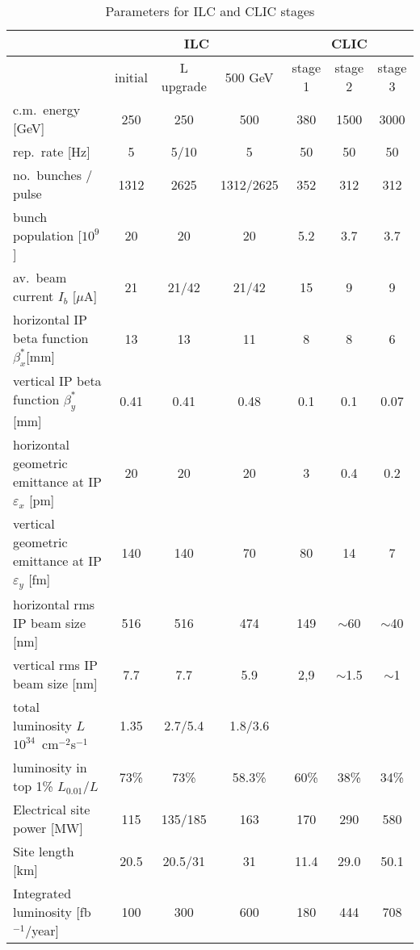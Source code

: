 \begin{landscape}
\begin{table}[htbp]
\caption{Parameters for ILC and CLIC stages}
\label{tab:ilc-clic}
\begin{center}
\begin{tabular}{l|ccc|ccc}
\hline\hline
 &  \multicolumn{3}{c|}{ILC} &
 \multicolumn{3}{c}{CLIC} \\
 \hline
  & initial & L upgrade  &  500 GeV &  stage 1 & stage 2 & stage 3 \\
 \hline
 c.m.~energy [GeV] & 250 & 250 & 500 & 380 &
 1500 & 3000 \\
 rep.~rate [Hz] & 5 & 5/10 & 5 & 50 & 50 & 50 \\
 no.~bunches / pulse & 1312 & 2625 & 1312/2625 & 
352 & 312 & 312 \\
 bunch population [$10^{9}$] & 20 & 20 & 20 & 5.2 
 &  3.7 & 3.7
 \\
av.~beam current $I_b$ [$\mu$A] & 21  & 21/42 & 21/42 
& 15 & 9  & 9  \\ 
horizontal IP beta function $\beta_{x}^{\ast}$[mm]
& 13 & 13 &11 & 8 & 8 & 6 \\
vertical IP beta function $\beta_{y}^{\ast}$ [mm]
& 0.41 & 0.41 & 0.48 &  0.1 & 0.1 & 0.07 \\
horizontal geometric emittance at IP $\varepsilon_{x}$ [pm]
& 20 & 20 & 20 & 3 & 0.4 & 0.2  \\
vertical geometric emittance at IP $\varepsilon_{y}$ [fm]
& 140  & 140 &  70 & 80 & 14 &  7\\
horizontal rms IP beam size [nm] & 516 & 516 & 474 & 
149 & $\sim$60 &  $\sim$40\\
vertical rms IP beam size [nm] & 7.7 & 7.7 & 5.9 & 
2,9 & $\sim$1.5 &  $\sim$1\\
total luminosity $L$ $10^{34}$~cm$^{-2}$s$^{-1}$ &
1.35 & 2.7/5.4 & 1.8/3.6 & & & \\
luminosity in top 1\% $L_{0.01}/L$ & 
73\% & 73\% & 58.3\% &  60\% & 38\% & 34\% \\
Electrical site power [MW] &  115 & 135/185 &
163 & 170 & 290 & 580 \\
Site length [km]  &  20.5 & 20.5/31 & 31 & 
11.4 & 29.0 & 50.1  \\
Integrated luminosity [fb$^{-1}$/year]	
& 100 & 300 & 600 & 180 & 444 & 708\\
\hline\hline
\end{tabular}
\end{center}
\end{table}
\end{landscape}



